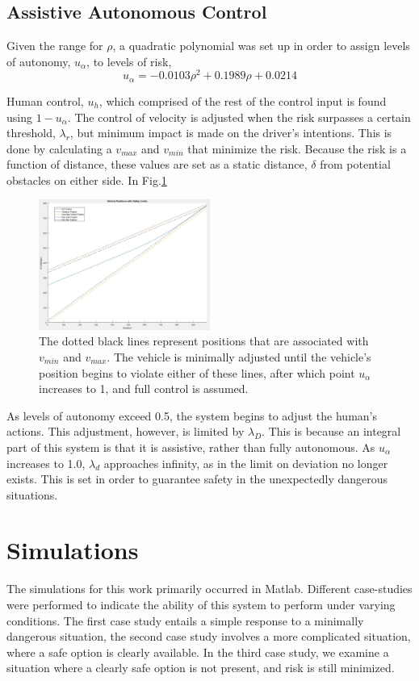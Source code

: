 \documentclass[conference]{IEEEtran}
\begin{document}
\subsection{Assistive Autonomous Control}

Given the range for $\rho$, a quadratic polynomial was set up in order to assign levels of autonomy, $u_{\alpha}$, to levels of risk,
\begin{equation}
u_{\alpha} = -0.0103\rho^{2} + 0.1989\rho + 0.0214
\end{equation}

Human control, $u_{h}$, which comprised of the rest of the control input is found using $1-u_{\alpha}$. The control of velocity is adjusted when the risk surpasses a certain threshold, $\lambda_{r}$, but minimum impact is made on the driver's intentions. This is done by calculating a $v_{max}$ and $v_{min}$ that minimize the risk. Because the risk is a function of distance, these values are set as a static distance, $\delta$ from potential obstacles on either side. In Fig.\ref{fig:vehiclepos}
\begin{figure}[ht]
    \includegraphics[width=0.5\textwidth]{vehiclepos.JPG}
    \caption{The dotted black lines represent positions that are associated with $v_{min}$ and $v_{max}$. The vehicle is minimally adjusted until the vehicle's position begins to violate either of these lines, after which point $u_{\alpha}$ increases to 1, and full control is assumed.}
    \label{fig:vehiclepos}
\end{figure}

As levels of autonomy exceed 0.5, the system begins to adjust the human's actions. This adjustment, however, is limited by $\lambda_{D}$. This is because an integral part of this system is that it is assistive, rather than fully autonomous. As $u_{\alpha}$ increases to 1.0, $\lambda_{d}$ approaches infinity, as in the limit on deviation no longer exists. This is set in order to guarantee safety in the unexpectedly dangerous situations.


\section{Simulations}
The simulations for this work primarily occurred in Matlab. Different case-studies were performed to indicate the ability of this system to perform under varying conditions. The first case study entails a simple response to a minimally dangerous situation, the second case study involves a more complicated situation, where a safe option is clearly available. In the third case study, we examine a situation where a clearly safe option is not present, and risk is still minimized.
\end{document}
